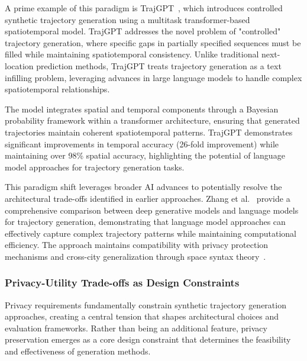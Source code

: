 \documentclass[runningheads]{llncs}
\begin{document}
A prime example of this paradigm is TrajGPT~\cite{hsuTrajGPTControlledSynthetic2024}, which introduces controlled synthetic trajectory generation using a multitask transformer-based spatiotemporal model. TrajGPT addresses the novel problem of "controlled" trajectory generation, where specific gaps in partially specified sequences must be filled while maintaining spatiotemporal consistency. Unlike traditional next-location prediction methods, TrajGPT treats trajectory generation as a text infilling problem, leveraging advances in large language models to handle complex spatiotemporal relationships.

The model integrates spatial and temporal components through a Bayesian probability framework within a transformer architecture, ensuring that generated trajectories maintain coherent spatiotemporal patterns. TrajGPT demonstrates significant improvements in temporal accuracy (26-fold improvement) while maintaining over 98\% spatial accuracy, highlighting the potential of language model approaches for trajectory generation tasks.

This paradigm shift leverages broader AI advances to potentially resolve the architectural trade-offs identified in earlier approaches. Zhang et al.~\cite{zhangEndtoendTrajectoryGeneration2025} provide a comprehensive comparison between deep generative models and language models for trajectory generation, demonstrating that language model approaches can effectively capture complex trajectory patterns while maintaining computational efficiency. The approach maintains compatibility with privacy protection mechanisms and cross-city generalization through space syntax theory~\cite{wangGTGGeneralizableTrajectory2025}.

\subsubsection{Privacy-Utility Trade-offs as Design Constraints}

Privacy requirements fundamentally constrain synthetic trajectory generation approaches, creating a central tension that shapes architectural choices and evaluation frameworks. Rather than being an additional feature, privacy preservation emerges as a core design constraint that determines the feasibility and effectiveness of generation methods.
\end{document}
